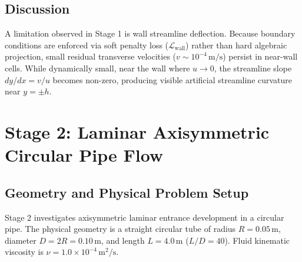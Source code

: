 \documentclass[11pt,a4paper]{article}
\begin{document}
\subsection{Discussion}
A limitation observed in Stage 1 is wall streamline deflection. Because boundary conditions are enforced via soft penalty loss ($\mathcal{L}_{\mathrm{wall}}$) rather than hard algebraic projection, small residual transverse velocities ($v \sim 10^{-4}\,\text{m/s}$) persist in near-wall cells. While dynamically small, near the wall where $u \to 0$, the streamline slope $dy/dx = v/u$ becomes non-zero, producing visible artificial streamline curvature near $y = \pm h$.

\section{Stage 2: Laminar Axisymmetric Circular Pipe Flow}
\label{sec:stage2}

\subsection{Geometry and Physical Problem Setup}
Stage 2 investigates axisymmetric laminar entrance development in a circular pipe. The physical geometry is a straight circular tube of radius $R = 0.05\,\text{m}$, diameter $D = 2R = 0.10\,\text{m}$, and length $L = 4.0\,\text{m}$ ($L/D = 40$). Fluid kinematic viscosity is $\nu = 1.0\times 10^{-4}\,\text{m}^2/\text{s}$.
\end{document}
